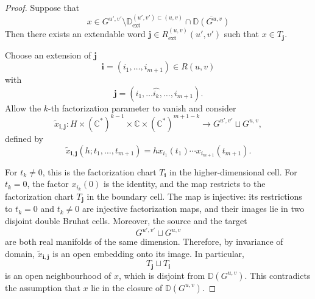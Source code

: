 \documentclass[10pt,a4paper]{amsart}
\newcommand{\D}{\mathbb D}
\begin{document}
\begin{proof}
Suppose that
\[
x\in
G^{u',v'}
\setminus
\D_{\mathrm{ext}}^{(u',v')\subset(u,v)}
\cap
\overline{\D(G^{u,v})}
\]
Then there exists an extendable word
\(
\mathbf j\in R_{\mathrm{ext}}^{(u,v)}(u',v')
\)
such that
\(
x\in T_{\mathbf j}.
\)


Choose an extension of $\mathbf j$
\[
\mathbf i=(i_1,\ldots,i_{m+1})\in R(u,v)
\]
with
\[
\mathbf j=(i_1,\ldots\hat{i_k},\ldots,i_{m+1}).
\]
 Allow the
$k$-th factorization parameter to vanish and consider
\[
\widetilde{x}_{\mathbf i,\mathbf j}:H\times(\mathbb C^*)^{k-1}\times\mathbb C\times(\mathbb C^*)^{m+1-k}\longrightarrow G^{u',v'}\sqcup G^{u,v},
\]
defined by
\[
\widetilde{x}_{\mathbf i,\mathbf j}
(h;t_1,\ldots,t_{m+1})
=
h x_{i_1}(t_1)\cdots x_{i_{m+1}}(t_{m+1}).
\]

For $t_k\neq0$, this is the factorization chart $T_{\mathbf i}$ in the higher-dimensional cell. For $t_k=0$, the factor $x_{i_k}(0)$ is the identity, and the map restricts to the factorization chart $T_{\mathbf j}$ in the boundary cell. The map is injective: its restrictions to $t_k=0$ and $t_k\neq0$ are injective factorization maps, and their images lie in two
disjoint double Bruhat cells. Moreover, the source and the target
\[
G^{u',v'}\sqcup G^{u,v}
\]
are both real manifolds of the same dimension. Therefore, by invariance of domain,
$\widetilde{x}_{\mathbf i,\mathbf j}$ is an open embedding onto its image.
In particular,
\[
T_{\mathbf j}\sqcup T_{\mathbf i}
\]
is an open neighbourhood of $x$, which is disjoint from $\D(G^{u,v})$. This contradicts the assumption that $x$ lie in the closure of $\D(G^{u,v})$.
\end{proof}
\end{document}
